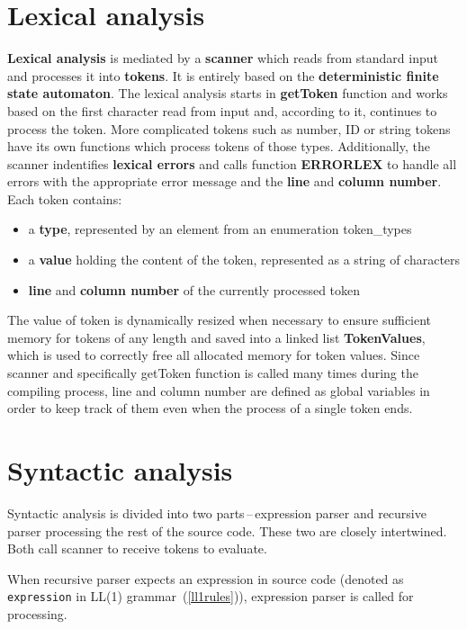 \documentclass[a4paper, 11pt]{article}
\begin{document}
\section{Lexical analysis}\label{sec:LEX}
\textbf{Lexical analysis} is mediated by a \textbf{scanner} which reads from standard input and processes it 
into \textbf{tokens}. It is entirely based on the \textbf{deterministic finite state automaton}. The lexical 
analysis starts in \textbf{getToken} function and works based on the first character read from input and, according to it, 
continues to process the token. More complicated tokens such as number, ID or string tokens have its own functions which 
process tokens of those types. Additionally, the scanner indentifies \textbf{lexical errors} and calls 
function \textbf{ERRORLEX} to handle all errors with the appropriate error message and the \textbf{line} and \textbf{column number}. 
Each token contains: 
\begin{itemize}
\item a \textbf{type}, represented by an element from an enumeration token\_types
\item a \textbf{value} holding the content of the token, represented as a string of characters
\item \textbf{line} and \textbf{column number} of the currently processed token
\end{itemize}
The value of token is dynamically resized when necessary to ensure sufficient memory for tokens of 
any length and saved into a linked list \textbf{TokenValues}, which is used to correctly free all 
allocated memory for token values. Since scanner and specifically getToken function is called many times during the compiling process, 
line and column number are defined as global variables in order to keep track of them even when the process of a single token ends.

\section{Syntactic analysis}\label{sec:SYNTACTIC}
Syntactic analysis is divided into two parts\,--\,expression parser and
recursive parser processing the rest of the source code. These two are closely intertwined.
Both call scanner to receive tokens to evaluate.\par
When recursive parser expects an expression in source code (denoted as \verb|expression| in LL(1) grammar~(\ref{ll1rules})), 
expression parser is called for processing.
\end{document}
